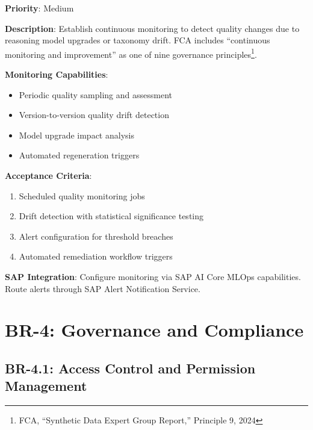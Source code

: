 \documentclass[12pt,a4paper,twoside]{report}
\begin{document}
\begin{tcolorbox}[colback=yellow!5,colframe=yellow!70,title=BR-3.5: Quality Drift Monitoring]
\textbf{Priority}: Medium

\textbf{Description}: Establish continuous monitoring to detect quality changes
due to reasoning model upgrades or taxonomy drift. FCA includes ``continuous
monitoring and improvement'' as one of nine governance principles\footnote{FCA,
``Synthetic Data Expert Group Report,'' Principle 9, 2024}.

\textbf{Monitoring Capabilities}:
\begin{itemize}
\item Periodic quality sampling and assessment
\item Version-to-version quality drift detection
\item Model upgrade impact analysis
\item Automated regeneration triggers
\end{itemize}

\textbf{Acceptance Criteria}:
\begin{enumerate}
\item Scheduled quality monitoring jobs
\item Drift detection with statistical significance testing
\item Alert configuration for threshold breaches
\item Automated remediation workflow triggers
\end{enumerate}

\textbf{SAP Integration}: Configure monitoring via SAP AI Core MLOps capabilities.
Route alerts through SAP Alert Notification Service.
\end{tcolorbox}


\section{BR-4: Governance and Compliance}

\subsection{BR-4.1: Access Control and Permission Management}
\end{document}
